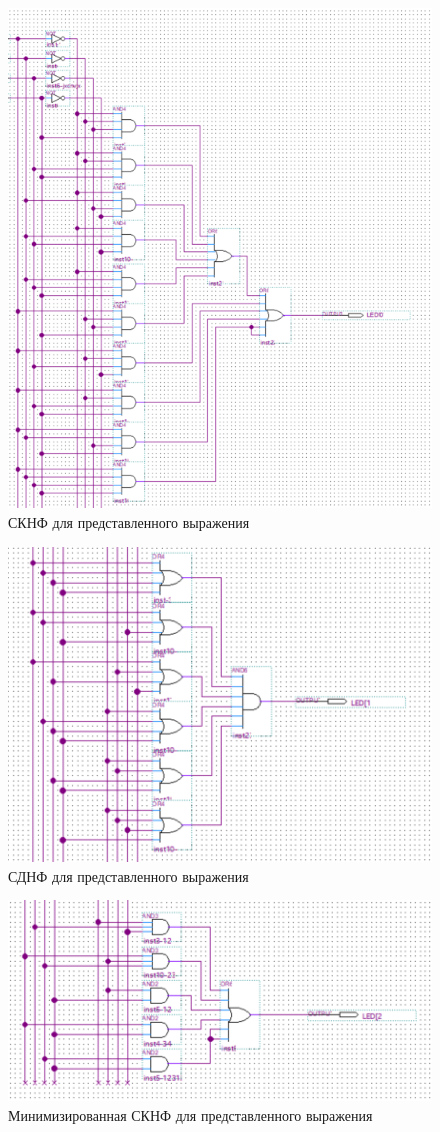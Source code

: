 \documentclass[a4paper,14pt]{article}
\begin{document}
\begin{figure}[H]
	\centering
	\includegraphics[width=0.8\linewidth]{image/schema_01}
	\caption{СКНФ для представленного выражения}
	\label{fig:schema_01}
\end{figure}

\begin{figure}[H]
	\centering
	\includegraphics[width=0.8\linewidth]{image/schema_02}
	\caption{СДНФ для представленного выражения}
	\label{fig:schema_02}
\end{figure}

\begin{figure}[H]
	\centering
	\includegraphics[width=0.8\linewidth]{image/schema_03}
	\caption{Минимизированная СКНФ для представленного выражения}
	\label{fig:schema_03}
\end{figure}
\end{document}
